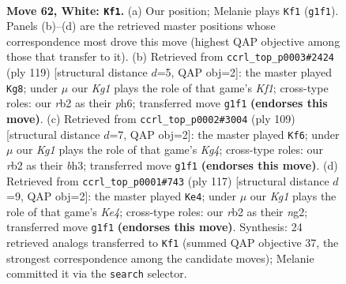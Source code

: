 \documentclass[11pt]{article}
\begin{document}
\clearpage

\begin{figure}[p]\centering
\begin{subfigure}{0.46\textwidth}\centering
\resizebox{\linewidth}{!}{%
\newchessgame
\chessboard[
  setfen={8/6k1/8/4p1p1/5p2/5B2/1r6/6K1 w - - 35 62},
  showmover=false,
  pgfstyle=straightmove, color=movearrow, markmove={g1-f1}
]}
\caption{}
\end{subfigure}\hfill
\begin{subfigure}{0.46\textwidth}\centering
\resizebox{\linewidth}{!}{%
\newchessgame
\chessboard[
  setfen={5k2/8/4K2P/6P1/5P2/8/1b6/8 b - - 0 60},
  showmover=false,
  pgfstyle=straightmove, color=movearrow, markmove={f8-g8}
]}
\caption{}
\end{subfigure}
\\[4pt]
\begin{subfigure}{0.46\textwidth}\centering
\resizebox{\linewidth}{!}{%
\newchessgame
\chessboard[
  setfen={8/8/1b1p4/1P1P2k1/2P5/5K1B/8/8 b - - 0 55},
  showmover=false,
  pgfstyle=straightmove, color=movearrow, markmove={g5-f6}
]}
\caption{}
\end{subfigure}\hfill
\begin{subfigure}{0.46\textwidth}\centering
\resizebox{\linewidth}{!}{%
\newchessgame
\chessboard[
  setfen={8/8/8/4k1b1/6P1/7P/4K1N1/8 b - - 0 59},
  showmover=false,
  pgfstyle=straightmove, color=movearrow, markmove={e5-e4}
]}
\caption{}
\end{subfigure}
\caption{\textbf{Move 62, White: \texttt{Kf1}.} (a) Our position; Melanie plays \texttt{Kf1} (\texttt{g1f1}). Panels (b)--(d) are the retrieved master positions whose correspondence most drove this move (highest QAP objective among those that transfer to it). (b) Retrieved from \texttt{ccrl\_top\_p0003\#2424} (ply 119) [structural distance $d$=5, QAP obj=2]: the master played \texttt{Kg8}; under $\mu$ our \emph{Kg1} plays the role of that game's \emph{Kf1}; cross-type roles: our \emph{r}b2 as their \emph{p}h6; transferred move \texttt{g1f1} \textbf{(endorses this move)}. (c) Retrieved from \texttt{ccrl\_top\_p0002\#3004} (ply 109) [structural distance $d$=7, QAP obj=2]: the master played \texttt{Kf6}; under $\mu$ our \emph{Kg1} plays the role of that game's \emph{Kg4}; cross-type roles: our \emph{r}b2 as their \emph{b}h3; transferred move \texttt{g1f1} \textbf{(endorses this move)}. (d) Retrieved from \texttt{ccrl\_top\_p0001\#743} (ply 117) [structural distance $d$=9, QAP obj=2]: the master played \texttt{Ke4}; under $\mu$ our \emph{Kg1} plays the role of that game's \emph{Ke4}; cross-type roles: our \emph{r}b2 as their \emph{n}g2; transferred move \texttt{g1f1} \textbf{(endorses this move)}. Synthesis: 24 retrieved analogs transferred to \texttt{Kf1} (summed QAP objective 37, the strongest correspondence among the candidate moves); Melanie committed it via the \texttt{search} selector.}
\label{fig:thought-m122}
\end{figure}
\end{document}
